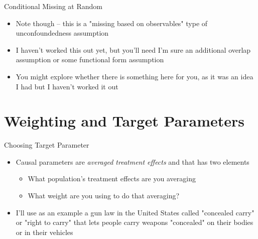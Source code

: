 \documentclass{beamer}
\begin{document}
\begin{frame}{Conditional Missing at Random}

\begin{itemize}
    \item Note though -- this is a "missing based on observables" type of unconfoundedness assumption
    \item I haven't worked this out yet, but you'll need I'm sure an additional overlap assumption or some functional form assumption
    \item You might explore whether there is something here for you, as it was an idea I had but I haven't worked it out

\end{itemize}

\end{frame}



\section{Weighting and Target Parameters}



\begin{frame}{Choosing Target Parameter}

\begin{itemize}
\item Causal parameters are \emph{averaged treatment effects} and that has two elements
	\begin{itemize}
	\item What population's treatment effects are you averaging
	\item What weight are you using to do that averaging?
	\end{itemize}
\item I'll use as an example a gun law in the United States called "concealed carry" or "right to carry" that lets people carry weapons "concealed" on their bodies or in their vehicles 
\end{itemize}

\end{frame}
\end{document}
